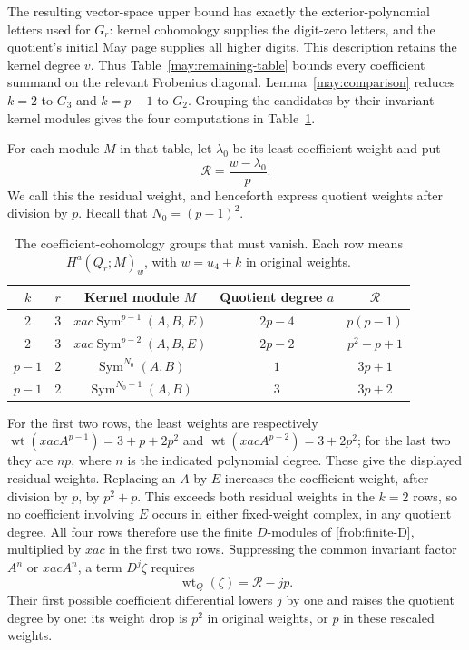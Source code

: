 The resulting vector-space upper bound has exactly the exterior-polynomial
letters used for $G_r$: kernel cohomology supplies the digit-zero letters,
and the quotient's initial May page supplies all higher digits.  This description
retains the kernel degree $v$.  Thus Table~\ref{may:remaining-table} bounds
every coefficient summand on the relevant Frobenius diagonal.
Lemma~\ref{may:comparison} reduces $k=2$ to $G_3$ and $k=p-1$ to $G_2$.
Grouping the candidates by their invariant kernel modules gives the four
computations in Table~\ref{frob:coefficient-obligations}.

For each module $M$ in that table, let $\lambda_0$ be its least coefficient
weight and put
\begin{equation}\label{frob:residual-weight}
 \mathcal R=\frac{w-\lambda_0}{p}.
\end{equation}
We call this the residual weight, and henceforth express quotient weights
after division by $p$.  Recall that $N_0=(p-1)^2$.
\begin{table}[htbp]
\centering
\begin{tabular}{ccccc}
\toprule
$k$ & $r$ & Kernel module $M$ & Quotient degree $a$ & $\mathcal R$\\
\midrule
$2$ & $3$ & $xac\operatorname{Sym}^{p-1}(A,B,E)$ & $2p-4$ & $p(p-1)$\\
$2$ & $3$ & $xac\operatorname{Sym}^{p-2}(A,B,E)$ & $2p-2$ & $p^2-p+1$\\
$p-1$ & $2$ & $\operatorname{Sym}^{N_0}(A,B)$ & $1$ & $3p+1$\\
$p-1$ & $2$ & $\operatorname{Sym}^{N_0-1}(A,B)$ & $3$ & $3p+2$\\
\bottomrule
\end{tabular}
\caption{The coefficient-cohomology groups that must vanish. Each row
means $H^a(Q_r;M)_w$, with $w=u_4+k$ in original weights.}
\label{frob:coefficient-obligations}
\end{table}

For the first two rows, the least weights are respectively
$\operatorname{wt}(xacA^{p-1})=3+p+2p^2$ and
$\operatorname{wt}(xacA^{p-2})=3+2p^2$; for the last two they are $np$,
where $n$ is the indicated polynomial degree.  These give the displayed
residual weights.  Replacing an $A$ by $E$ increases the coefficient weight,
after division by $p$, by $p^2+p$.  This exceeds both residual weights in
the $k=2$ rows, so no coefficient involving $E$ occurs in either fixed-weight
complex, in any quotient degree.  All four rows therefore use the finite
$D$-modules of \eqref{frob:finite-D}, multiplied by $xac$ in the first two
rows.  Suppressing the common invariant factor $A^n$ or $xacA^n$, a term
$D^j\zeta$ requires
\begin{equation}\label{frob:D-weight}
 \operatorname{wt}_Q(\zeta)=\mathcal R-jp.
\end{equation}
Their first possible coefficient differential lowers $j$ by one and raises
the quotient degree by one: its weight drop is $p^2$ in original weights,
or $p$ in these rescaled weights.

